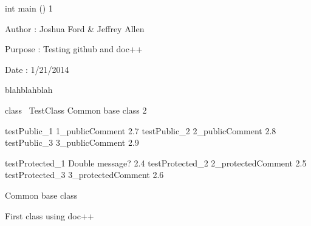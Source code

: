 \documentclass{article}
\begin{document}
\pagebreak
\sloppy
\begin{cxxContents}
\end{cxxContents}
\begin{cxxfunction}
{int}
        {main}
        {()}
        {}
        {1}
\begin{cxxdoc}


Author  : Joshua Ford \& Jeffrey Allen

Purpose : Testing github and doc++

Date    : 1/21/2014

blahblahblah

\end{cxxdoc}
\end{cxxfunction}
\begin{cxxclass}
{class\ }
        {TestClass}
        {}
        {Common base class}
        {2}
\begin{cxxpublic}
        {testPublic\_1}
        {}
        {1\_publicComment}
        {2.7}
        {testPublic\_2}
        {}
        {2\_publicComment}
        {2.8}
        {testPublic\_3}
        {}
        {3\_publicComment}
        {2.9}
\end{cxxpublic}
\begin{cxxprotected}
        {testProtected\_1}
        {}
        {Double message?}
        {2.4}
        {testProtected\_2}
        {}
        {2\_protectedComment}
        {2.5}
        {testProtected\_3}
        {}
        {3\_protectedComment}
        {2.6}
\end{cxxprotected}
\begin{cxxdoc}
Common base class

First class using doc++


\end{cxxdoc}
\end{cxxclass}
\end{document}
